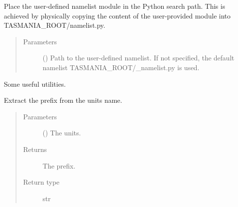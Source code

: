 \documentclass[letterpaper,10pt,english]{sphinxmanual}
\begin{document}
\begin{fulllineitems}
\label{\detokenize{api:tasmania.set_namelist.set_namelist}}
Place the user-defined namelist module in the Python search path.
This is achieved by physically copying the content of the user-provided module into TASMANIA\_ROOT/namelist.py.
\begin{quote}\begin{description}
\item[{Parameters}] \leavevmode
{} () \textendash{} Path to the user-defined namelist. If not specified, the default namelist TASMANIA\_ROOT/\_namelist.py is used.

\end{description}\end{quote}

\end{fulllineitems}

\label{\detokenize{api:module-tasmania.utils.utils}}
Some useful utilities.

\begin{fulllineitems}
\label{\detokenize{api:tasmania.utils.utils._get_prefix}}
Extract the prefix from the units name.
\begin{quote}\begin{description}
\item[{Parameters}] \leavevmode
{} () \textendash{} The units.

\item[{Returns}] \leavevmode
The prefix.

\item[{Return type}] \leavevmode
str

\end{description}\end{quote}

\end{fulllineitems}

\end{document}
